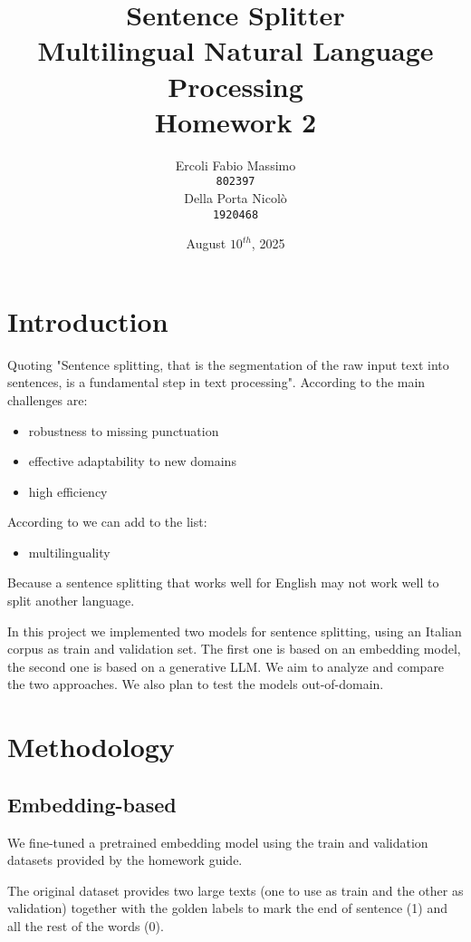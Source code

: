 \documentclass[11pt]{article}
\title{%
	Sentence Splitter\\
	\large Multilingual Natural Language Processing \\
	Homework 2}
\date{August $10^{th}$, 2025}
\author{Ercoli Fabio Massimo \\
\texttt{802397} \\\And
Della Porta Nicolò \\
\texttt{1920468} \\}
\begin{document}
\maketitle

\section{Introduction}

Quoting \cite{redaelli-sprugnoli-2024-sentence} "Sentence splitting, that is the segmentation of the raw input text into sentences, is a fundamental step in text processing".  According to \cite{frohmann2024segmenttextuniversalapproach} the main challenges are:

\begin{itemize}
	\item robustness to missing punctuation
	\item effective adaptability to new domains
	\item high efficiency
\end{itemize}

According to \cite{redaelli-sprugnoli-2024-sentence} we can add to the list:

\begin{itemize}
	\item multilinguality
\end{itemize}

Because a sentence splitting that works well for English may not work well to split another language.

In this project we implemented two models for sentence splitting, using an Italian corpus as train and validation set.
The first one is based on an embedding model, the second one is based on a generative LLM.
We aim to analyze and compare the two approaches. 
We also plan to test the models out-of-domain.

\section{Methodology}

\subsection{Embedding-based}

We fine-tuned a pretrained embedding model using the train and validation datasets provided by the homework guide.

The original dataset provides two large texts (one to use as train and the other as validation) together with the golden labels to mark the end of sentence (1) and all the rest of the words (0).
\end{document}
